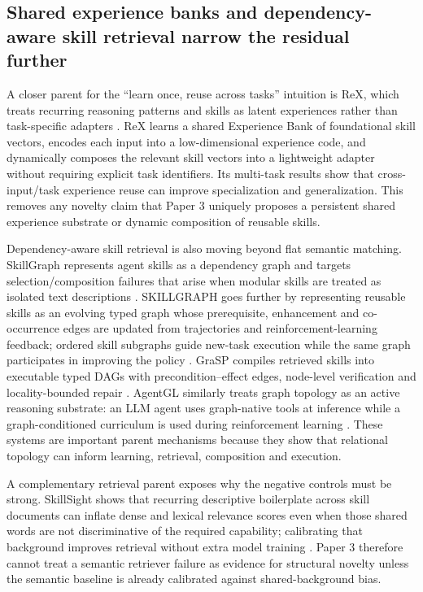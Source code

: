 \subsection{Shared experience banks and dependency-aware skill retrieval narrow the residual further}

A closer parent for the ``learn once, reuse across tasks'' intuition is ReX, which treats recurring reasoning patterns and skills as latent experiences rather than task-specific adapters \cite{ling2026rex}. ReX learns a shared Experience Bank of foundational skill vectors, encodes each input into a low-dimensional experience code, and dynamically composes the relevant skill vectors into a lightweight adapter without requiring explicit task identifiers. Its multi-task results show that cross-input/task experience reuse can improve specialization and generalization. This removes any novelty claim that Paper 3 uniquely proposes a persistent shared experience substrate or dynamic composition of reusable skills.

Dependency-aware skill retrieval is also moving beyond flat semantic matching. SkillGraph represents agent skills as a dependency graph and targets selection/composition failures that arise when modular skills are treated as isolated text descriptions \cite{wu2026skillgraph}. SKILLGRAPH goes further by representing reusable skills as an evolving typed graph whose prerequisite, enhancement and co-occurrence edges are updated from trajectories and reinforcement-learning feedback; ordered skill subgraphs guide new-task execution while the same graph participates in improving the policy \cite{li2026skillgraphrl}. GraSP compiles retrieved skills into executable typed DAGs with precondition--effect edges, node-level verification and locality-bounded repair \cite{xia2026grasp}. AgentGL similarly treats graph topology as an active reasoning substrate: an LLM agent uses graph-native tools at inference while a graph-conditioned curriculum is used during reinforcement learning \cite{sun2026agentgl}. These systems are important parent mechanisms because they show that relational topology can inform learning, retrieval, composition and execution.

A complementary retrieval parent exposes why the negative controls must be strong. SkillSight shows that recurring descriptive boilerplate across skill documents can inflate dense and lexical relevance scores even when those shared words are not discriminative of the required capability; calibrating that background improves retrieval without extra model training \cite{xiao2026skillsight}. Paper 3 therefore cannot treat a semantic retriever failure as evidence for structural novelty unless the semantic baseline is already calibrated against shared-background bias.

